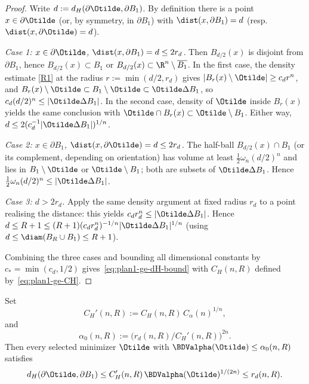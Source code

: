 \begin{proof}
Write \(d:=d_H(\partial\Otilde,\partial B_1)\). By definition there is a
point \(x\in\partial\Otilde\) (or, by symmetry, in \(\partial B_1\)) with
\(\dist(x,\partial B_1)=d\) (resp.\ \(\dist(x,\partial\Otilde)=d\)).

\emph{Case 1: \(x\in\partial\Otilde\), \(\dist(x,\partial B_1)=d\le 2 r_d\).}
Then \(B_{d/2}(x)\) is disjoint from \(\partial B_1\), hence
\(B_{d/2}(x)\subset B_1\) or \(B_{d/2}(x)\subset\R^n\setminus\overline{B_1}\).
In the first case, the density estimate \ref{R1} at the radius
\(r:=\min(d/2,r_d)\) gives
\(|B_r(x)\setminus\Otilde|\ge c_d r^n\), and
\(B_r(x)\setminus\Otilde\subset B_1\setminus\Otilde
\subset\Otilde\Delta B_1\), so
\(c_d (d/2)^n\le|\Otilde\Delta B_1|\). In the second case, density of
\(\Otilde\) inside \(B_r(x)\) yields the same conclusion with
\(\Otilde\cap B_r(x)\subset\Otilde\setminus B_1\). Either way,
\(d\le 2(c_d^{-1}|\Otilde\Delta B_1|)^{1/n}\).

\emph{Case 2: \(x\in\partial B_1\), \(\dist(x,\partial\Otilde)=d\le 2 r_d\).}
The half-ball \(B_{d/2}(x)\cap B_1\) (or its complement, depending on
orientation) has volume at least \(\tfrac12\omega_n(d/2)^n\) and lies in
\(B_1\setminus\Otilde\) or \(\Otilde\setminus B_1\); both are subsets of
\(\Otilde\Delta B_1\). Hence
\(\tfrac12\omega_n(d/2)^n\le|\Otilde\Delta B_1|\).

\emph{Case 3: \(d>2 r_d\).} Apply the same density argument at fixed
radius \(r_d\) to a point realising the distance: this yields
\(c_d r_d^n\le|\Otilde\Delta B_1|\). Hence
\(d\le R+1\le(R+1)(c_d r_d^n)^{-1/n}|\Otilde\Delta B_1|^{1/n}\) (using
\(d\le\diam(B_R\cup B_1)\le R+1\)).

Combining the three cases and bounding all dimensional constants by
\(c_*=\min(c_d,1/2)\) gives~\eqref{eq:plan1-ge-dH-bound} with
\(C_H(n,R)\) defined by~\eqref{eq:plan1-ge-CH}.
\end{proof}

\begin{proposition}
\label{prop:plan1-ge-alpha-to-H}
Set
\begin{equation}\label{eq:plan1-ge-CHprime}
   C_H'(n,R):=C_H(n,R)\,C_\alpha(n)^{1/n},
\end{equation}
and
\begin{equation}\label{eq:plan1-ge-alpha0}
   \alpha_0(n,R):=\bigl(r_d(n,R)/C_H'(n,R)\bigr)^{2n}.
\end{equation}
Then every selected minimizer \(\Otilde\) with
\(\BDValpha(\Otilde)\le\alpha_0(n,R)\) satisfies
\begin{equation}\label{eq:plan1-ge-dH-alpha}
   d_H(\partial\Otilde,\partial B_1)
   \le C_H'(n,R)\,\BDValpha(\Otilde)^{1/(2n)}\le r_d(n,R).
\end{equation}
\end{proposition}

